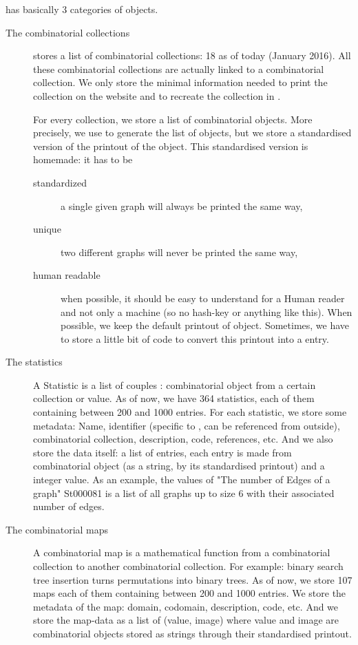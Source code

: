 \FindStat has basically 3 categories of objects.

\begin{description}
\item[The combinatorial collections] \FindStat stores a list of combinatorial collections: 18 as of today (January 2016). All these combinatorial collections are actually linked to a \SageMath combinatorial collection. We only store the minimal  information needed to print the collection on the website and to recreate the collection in \SageMath.

For every collection, we store a list of combinatorial objects. More precisely, we use \SageMath to generate the list of objects,
but we store a standardised version of the printout of the object. This standardised version is homemade: it has to be
\begin{description}
\item[standardized] a single given graph will always be printed the same way,
\item[unique] two different graphs will never be printed the same way,
\item[human readable] when possible, it should be easy to understand for a Human reader and not only a machine (so no hash-key or anything like this).
When possible, we keep the default printout of \SageMath object. Sometimes, we have to store a little bit of code to convert this printout into a
\SageMath entry.
\end{description}

\item[The statistics] A Statistic is a list of couples : combinatorial object from a certain collection or value. As of now, we have 364 statistics,
each of them containing between 200 and 1000 entries. For each statistic, we store some metadata: Name, identifier
(specific to \FindStat, can be referenced from outside), combinatorial collection, description, code, references, etc. And we also store the data itself: a list of entries,
each entry is made from combinatorial object (as a string, by its standardised printout) and a integer value. As an example, the values of "The number of Edges of a graph"
St000081 is a list of all graphs up to size 6 with their associated number of edges.

\item[The combinatorial maps] A combinatorial map is a mathematical function from a combinatorial collection to another combinatorial collection. For example: binary search
tree insertion turns permutations into binary trees. As of now, we store 107 maps each of them containing between 200 and 1000 entries. We store the metadata of the map: domain, codomain, description, code, etc. And we store the map-data as a list of (value, image)
where value and image are combinatorial objects stored as strings through their standardised printout.
\end{description}


